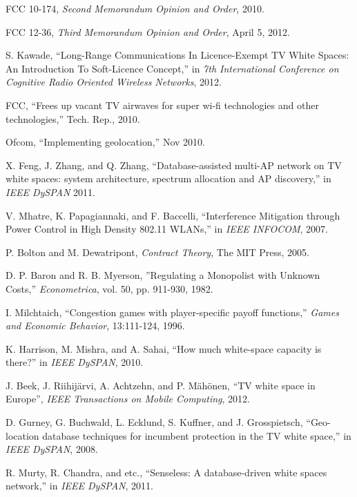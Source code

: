 \documentclass[journal]{IEEEtran}
\begin{document}
\begin{thebibliography}{1}

 FCC 10-174, \emph{Second Memorandum Opinion and Order}, 2010.

 FCC 12-36, \emph{Third Memorandum Opinion and Order}, April 5, 2012.

 S. Kawade, ``Long-Range Communications In Licence-Exempt TV White Spaces: An Introduction To Soft-Licence Concept,'' in \emph{7th International Conference on Cognitive Radio Oriented Wireless Networks}, 2012.

 FCC, ``Frees up vacant TV airwaves for super wi-fi technologies and other technologies,'' Tech. Rep., 2010.

 Ofcom, ``Implementing geolocation,'' Nov 2010.

 X. Feng, J. Zhang, and Q. Zhang, ``Database-assisted multi-AP network on TV white spaces: system architecture, spectrum allocation and AP discovery,'' in \emph{IEEE DySPAN} 2011.

 V. Mhatre, K. Papagiannaki, and F. Baccelli, ``Interference Mitigation through Power Control in High Density 802.11 WLANs,'' in \emph{IEEE INFOCOM}, 2007.

 P. Bolton and M. Dewatripont, \emph{Contract Theory}, The MIT Press, 2005.

 D. P. Baron and R. B. Myerson, ''Regulating a Monopolist with Unknown Costs,'' \emph{Econometrica}, vol. 50, pp. 911-930, 1982.

 I. Milchtaich, ``Congestion games with player-specific payoff functions,'' \emph{Games and Economic Behavior}, 13:111-124, 1996.

 K. Harrison, M. Mishra, and A. Sahai, ``How much white-space capacity is there?'' in \emph{IEEE DySPAN}, 2010.

 J. Beek, J. Riihij\"{a}rvi, A. Achtzehn, and P. M\"{a}h\"{o}nen, ``TV white space in Europe'', \emph{IEEE Transactions on Mobile Computing}, 2012.

 D. Gurney, G. Buchwald, L. Ecklund, S. Kuffner, and J. Grosspietsch,
``Geo-location database techniques for incumbent protection in the TV white space,'' in \emph{IEEE DySPAN}, 2008.

 R. Murty, R. Chandra, and etc., ``Senseless: A database-driven white spaces network,'' in \emph{IEEE DySPAN}, 2011.


\end{thebibliography}
\end{document}
